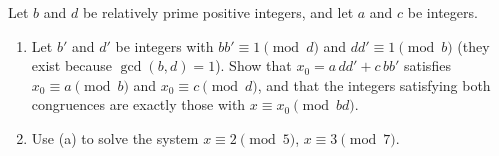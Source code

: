 Let $b$ and $d$ be relatively prime positive integers, and let $a$ and $c$ be integers.
\begin{enumerate}
\item[(a)] Let $b'$ and $d'$ be integers with $bb'\equiv1\pmod d$ and $dd'\equiv1\pmod b$ (they exist because $\gcd(b,d)=1$). Show that $x_0=a\,dd'+c\,bb'$ satisfies $x_0\equiv a\pmod b$ and $x_0\equiv c\pmod d$, and that the integers satisfying both congruences are exactly those with $x\equiv x_0\pmod{bd}$.
\item[(b)] Use (a) to solve the system $x\equiv2\pmod5$, $x\equiv3\pmod7$.
\end{enumerate}
